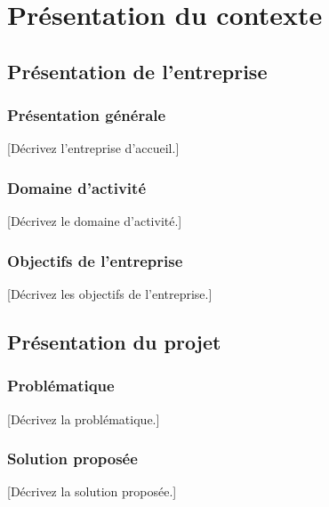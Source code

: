 \chapter{Présentation du contexte}

\minitoc

\section{Présentation de l'entreprise}

\subsection{Présentation générale}
[Décrivez l'entreprise d'accueil.]

\subsection{Domaine d'activité}
[Décrivez le domaine d'activité.]

\subsection{Objectifs de l'entreprise}
[Décrivez les objectifs de l'entreprise.]

\section{Présentation du projet}

\subsection{Problématique}
[Décrivez la problématique.]

\subsection{Solution proposée}
[Décrivez la solution proposée.]

